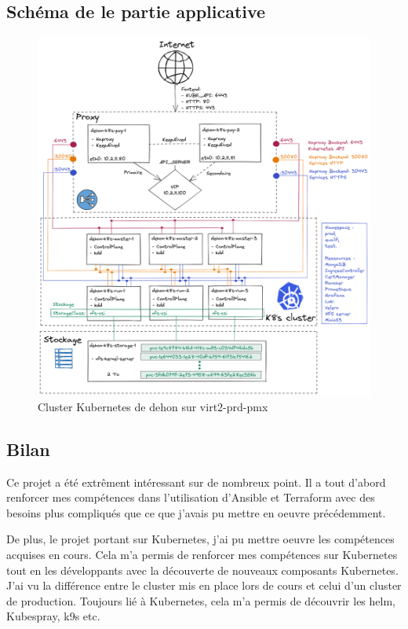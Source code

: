 \documentclass[12pt]{article}
\begin{document}
\subsection{Schéma de le partie applicative}
\begin{figure}[!ht]
    \centering
        \includegraphics[width=\textwidth]{src/graph_dehon2.png}
    \caption{Cluster \gls{Kubernetes} de dehon sur virt2-prd-pmx}
    \label{fig:graph_dehon2}
\end{figure}

\subsection{Bilan}
Ce projet a été extrêment intéressant sur de nombreux point.
Il a tout d'abord renforcer mes compétences dans l'utilisation d'\gls{Ansible} et \gls{Terraform} avec des besoins plus compliqués que ce que j'avais pu mettre en oeuvre précédemment.

De plus, le projet portant sur \gls{Kubernetes}, j'ai pu mettre oeuvre les compétences acquises en cours. 
Cela m'a permis de renforcer mes compétences sur \gls{Kubernetes} tout en les développants avec la découverte de nouveaux composants \gls{Kubernetes}.
J'ai vu la différence entre le \gls{cluster} mis en place lors de cours et celui d'un \gls{cluster} de production.
Toujours lié à \gls{Kubernetes}, cela m'a permis de découvrir les helm, \gls{Kubespray}, k9s etc.
\end{document}
